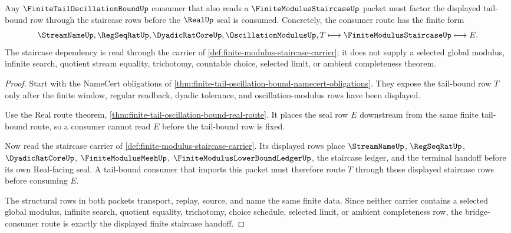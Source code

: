 \begin{theorem}
\label{thm:finite-tail-oscillation-bound-bridge-consumer-route}
Any $\FiniteTailOscillationBoundUp$ consumer that also reads a $\FiniteModulusStaircaseUp$ packet must factor the displayed tail-bound row through the staircase rows before the $\RealUp$ seal is consumed. Concretely, the consumer route has the finite form
$$
\StreamNameUp,\RegSeqRatUp,\DyadicRatCoreUp,\OscillationModulusUp,T
\longmapsto \FiniteModulusStaircaseUp \longmapsto E .
$$
The staircase dependency is read through the carrier of \autoref{def:finite-modulus-staircase-carrier}; it does not supply a selected global modulus, infinite search, quotient stream equality, trichotomy, countable choice, selected limit, or ambient completeness theorem.
\end{theorem}
\begin{proof}
Start with the NameCert obligations of \autoref{thm:finite-tail-oscillation-bound-namecert-obligations}. They expose the tail-bound row $T$ only after the finite window, regular readback, dyadic tolerance, and oscillation-modulus rows have been displayed.

Use the Real route theorem, \autoref{thm:finite-tail-oscillation-bound-real-route}. It places the seal row $E$ downstream from the same finite tail-bound route, so a consumer cannot read $E$ before the tail-bound row is fixed.

Now read the staircase carrier of \autoref{def:finite-modulus-staircase-carrier}. Its displayed rows place $\StreamNameUp$, $\RegSeqRatUp$, $\DyadicRatCoreUp$, $\FiniteModulusMeshUp$, $\FiniteModulusLowerBoundLedgerUp$, the staircase ledger, and the terminal handoff before its own Real-facing seal. A tail-bound consumer that imports this packet must therefore route $T$ through those displayed staircase rows before consuming $E$.

The structural rows in both packets transport, replay, source, and name the same finite data. Since neither carrier contains a selected global modulus, infinite search, quotient equality, trichotomy, choice schedule, selected limit, or ambient completeness row, the bridge-consumer route is exactly the displayed finite staircase handoff.
\end{proof}


